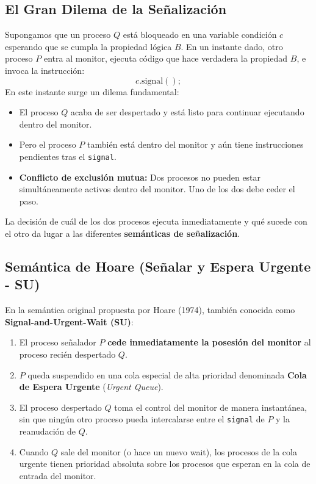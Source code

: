 \subsection{El Gran Dilema de la Señalización}
Supongamos que un proceso $Q$ está bloqueado en una variable condición $c$ esperando que se cumpla la propiedad lógica $B$. En un instante dado, otro proceso $P$ entra al monitor, ejecuta código que hace verdadera la propiedad $B$, e invoca la instrucción:
\[
c.\text{signal}();
\]
En este instante surge un dilema fundamental:
\begin{itemize}[leftmargin=*]
    \item El proceso $Q$ acaba de ser despertado y está listo para continuar ejecutando dentro del monitor.
    \item Pero el proceso $P$ también está dentro del monitor y aún tiene instrucciones pendientes tras el \texttt{signal}.
    \item \textbf{Conflicto de exclusión mutua:} Dos procesos no pueden estar simultáneamente activos dentro del monitor. Uno de los dos debe ceder el paso.
\end{itemize}

La decisión de cuál de los dos procesos ejecuta inmediatamente y qué sucede con el otro da lugar a las diferentes \textbf{semánticas de señalización}.

\subsection{Semántica de Hoare (Señalar y Espera Urgente - SU)}
En la semántica original propuesta por Hoare (1974), también conocida como \textbf{Signal-and-Urgent-Wait (SU)}:

\begin{enumerate}[leftmargin=*]
    \item El proceso señalador $P$ \textbf{cede inmediatamente la posesión del monitor} al proceso recién despertado $Q$.
    \item $P$ queda suspendido en una cola especial de alta prioridad denominada \textbf{Cola de Espera Urgente} (\emph{Urgent Queue}).
    \item El proceso despertado $Q$ toma el control del monitor de manera instantánea, sin que ningún otro proceso pueda intercalarse entre el \texttt{signal} de $P$ y la reanudación de $Q$.
    \item Cuando $Q$ sale del monitor (o hace un nuevo wait), los procesos de la cola urgente tienen prioridad absoluta sobre los procesos que esperan en la cola de entrada del monitor.
\end{enumerate}

